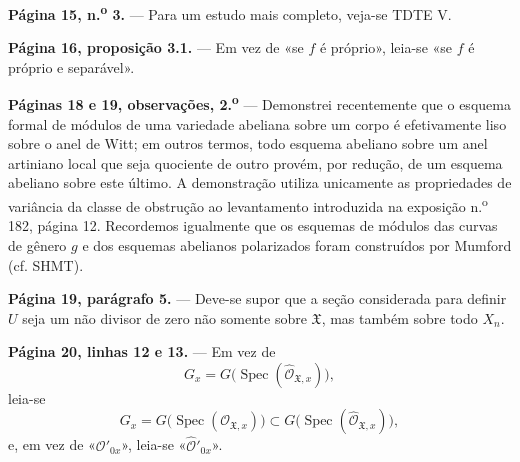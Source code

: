 \documentclass[11pt,twoside,openany]{book}
\numberwithin{equation}{section}
\newcommand{\src}[1]{%
  \phantomsection\hypertarget{src:#1}{}%
  \marginpar{\raggedleft\footnotesize\sffamily #1}%
}
\theoremstyle{plain}
\theoremstyle{definition}
\theoremstyle{remark}
\newcommand{\FgaUnitKey}{frontmatter}
\renewcommand{\src}[1]{%
  \phantomsection\hypertarget{src:\FgaUnitKey:#1}{}%
  \marginpar{\raggedleft\footnotesize\sffamily #1}%
}
\begin{document}
\src{301}
\noindent\textbf{Página 15, n.\textsuperscript{o} 3.} --- Para um estudo mais
completo, veja-se TDTE V.

\noindent\textbf{Página 16, proposição 3.1.} --- Em vez de «se $f$ é
próprio», leia-se «se $f$ é próprio e separável».

\noindent\textbf{Páginas 18 e 19, observações, 2.\textsuperscript{o}} --- Demonstrei
recentemente que o esquema formal de módulos de uma variedade
abeliana sobre um corpo é efetivamente liso sobre o anel de Witt; em
outros termos, todo esquema abeliano sobre um anel artiniano local que seja
quociente de outro provém, por redução, de um esquema abeliano sobre este
último. A demonstração utiliza unicamente as propriedades de variância da
classe de obstrução ao levantamento introduzida na exposição
n.\textsuperscript{o} 182, página 12. Recordemos igualmente que os esquemas de
módulos das curvas de gênero $g$ e dos esquemas abelianos polarizados foram
construídos por Mumford (cf. SHMT).

\noindent\textbf{Página 19, parágrafo 5.} --- Deve-se supor que a seção
considerada para definir $U$ seja um não divisor de zero não somente sobre
$\mathfrak X$, mas também sobre todo $X_n$.

\noindent\textbf{Página 20, linhas 12 e 13.} --- Em vez de
\[
  G_x=G\bigl(\operatorname{Spec}(\widehat{\mathcal O}_{\mathfrak X,x})\bigr),
\]
leia-se
\[
  G_x=G\bigl(\operatorname{Spec}(\mathcal O_{\mathfrak X,x})\bigr)
  \subset
  G\bigl(\operatorname{Spec}(\widehat{\mathcal O}_{\mathfrak X,x})\bigr),
\]
e, em vez de «$\mathcal O'_{0x}$», leia-se
«$\widehat{\mathcal O}'_{0x}$».

\par
\end{document}
